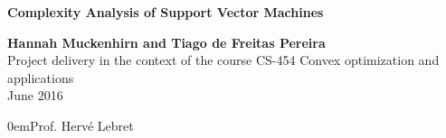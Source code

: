 \begin{titlepage}


\begin{center}
\begin{figure}[hbtp]
\begin{center}
{
	\bf {}
}
\end{center}
\end{figure}

\vspace{3cm}
{\LARGE{{\bf{Complexity Analysis of Support Vector Machines}}}}
\vspace{2cm}

{\large {\bf{Hannah Muckenhirn and Tiago de Freitas Pereira}}} \\
\vspace{2cm}
{\large Project delivery in the context of the course CS-454 Convex optimization and applications
\\
	June 2016}
\vspace{1cm}
\end{center}


{\parindent0em{Prof. Herv\'e Lebret\\}}


\end{titlepage}
